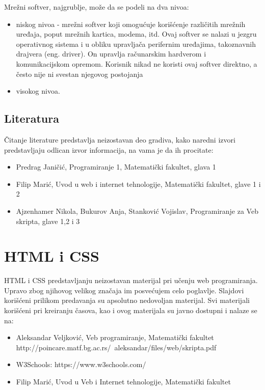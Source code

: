 \documentclass[a4paper]{article}
\begin{document}
Mrežni softver, najgrublje, može da se podeli na dva nivoa:
\begin{itemize}
\item niskog nivoa - mrežni softver koji omogućuje korišćenje različitih mrežnih uređaja, poput mrežnih kartica, modema, itd. Ovaj softver se nalazi u jezgru operativnog sistema i u obliku upravljača perifernim uređajima, takoznavnih drajvera (eng. driver). On upravlja računarskim hardverom i komunikacijskom opremom. Korisnik nikad ne koristi ovaj softver direktno, a često nije ni svestan njegovog postojanja 
\item visokog nivoa.
\end{itemize}

\subsection{Literatura}
Čitanje literature predstavlja neizostavan deo gradiva, kako naredni izvori predstavljaju odlican izvor informacija, na vama je da ih procitate:
\begin{itemize}
\item Predrag Janičić, Programiranje 1, Matematički fakultet, glava 1
\item Filip Marić, Uvod u web i internet tehnologije, Matematički fakultet, glave 1 i 2
\item Ajzenhamer Nikola, Bukurov Anja, Stanković Vojislav, Programiranje za Veb skripta, glave 1,2 i 3
\end{itemize}
\newpage

\section{HTML i CSS}
\label{sec:htmlcss}
HTML i CSS predstavljanju neizostavan materijal pri učenju web programiranja. Upravo zbog njihovog velikog značaja im posvećujem celo poglavlje. Slajdovi korišćeni prilikom predavanja su apsolutno nedovoljan materijal. Svi materijali korišćeni pri kreiranju časova, kao i ovog materijala su javno dostupni i nalaze se na:
\begin{itemize}
\item Aleksandar Veljković, Veb programiranje, Matematički fakultet http://poincare.matf.bg.ac.rs/~aleksandar/files/web/skripta.pdf
\item W3Schools: https://www.w3schools.com/
\item Filip Marić, Uvod u Veb i Internet tehnologije, Matematički fakultet 
\end{itemize}
\end{document}
